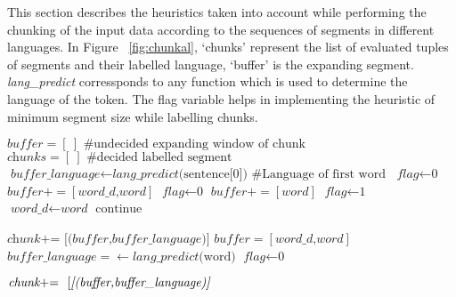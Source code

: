 \documentclass[11pt]{article}
\begin{document}
This section describes the heuristics taken into account while performing the chunking of the input data according to 
the sequences of segments in different languages. 
In Figure ~\ref{fig:chunkal}, `chunks' represent the list of evaluated tuples of segments and their labelled language, `buffer' is the expanding segment.
 \textit{lang\_predict} corressponds to any function which is used to determine the language of the token. The flag 
variable helps in implementing the heuristic of minimum segment size while labelling chunks.
\begin{algorithm}
\caption*{\textsc{}}
{\fontsize{10}{10}\selectfont
\begin{algorithmic}[1]
\State $\textit{buffer} = [\ ] \text{\ \ \  \#undecided expanding window of chunk}$
\State $\textit{chunks} = [\ ] \text{\ \ \  \#decided labelled segment}$
\State $\textit{buffer\_language} \gets \textit{lang\_predict}\text{(sentence[0])} \text{\ \ \ \#Language of first word}$
\State $\textit{flag} \gets \text{0}$
        \State $\textit{buffer} += [\textit{word\_d,word}] $
        \State $\textit{flag} \gets \text{0}$
        \Else
        \State $\textit{buffer} += [\textit{word}] $
        \EndIf
        \EndIf
{}
        \State $\textit{flag} \gets \text{1}$
        \State $\textit{word\_d} \gets \textit{word} $
        \State $\text{continue}$

        \Else
        \State $\textit{chunk} \text{+= \ }  \textit{[(buffer,buffer\_language)]} $
        \State $\textit{buffer} = [\textit{word\_d,word}] $
        \State $\textit{buffer\_language} = \gets \textit{lang\_predict}\text{(word)}$%
        \State $\textit{flag} \gets \text{0}$
        \EndIf

\EndIf
\EndFor
{}
        \State $\textit{chunk} \text{+= \ }  \text{[\textit{[(buffer,buffer\_language)]}} $

\EndIf
\end{algorithmic}}
\end{algorithm}
\end{document}

